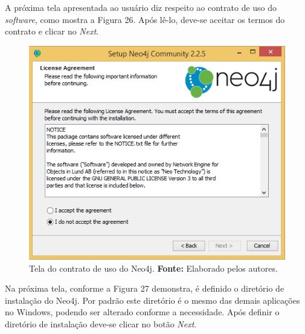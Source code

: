 \par A próxima tela apresentada ao usuário diz respeito ao contrato de uso do \textit{software}, como mostra a Figura 26. Após lê-lo, deve-se aceitar os termos do contrato e clicar no \textit{Next}.

\newpage
\begin{figure}[h!]
	\centerline{\includegraphics[scale=0.4]{./imagens/neo4j-install-step2.png}}
	\caption[Tela do contrato de uso do Neo4j]
	{Tela do contrato de uso do Neo4j. \textbf{Fonte:} Elaborado pelos autores.}
	\label{fig:exemplo1}
\end{figure}

\par Na próxima tela, conforme a Figura 27 demonstra, é definido o diretório de instalação do Neo4j. Por padrão este diretório é o mesmo das demais aplicações no Windows, podendo ser alterado conforme a necessidade. Após definir o diretório de instalação deve-se clicar no botão \textit{Next}.

